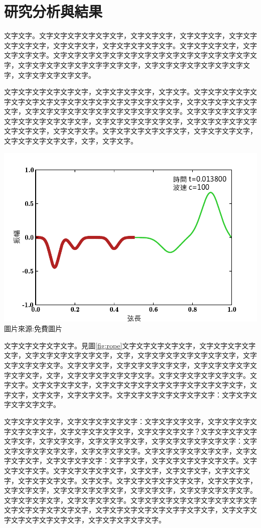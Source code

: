 \documentclass[12pt]{article}
\begin{document}
\section{研究分析與結果}


文字文字。文字文字文字文字文字文字，文字文字文字，文字文字文字，文字文字文字文字文字，文字文字文字，文字文字文字文字文字。文字文字文字文字，文字文字文字文字。文字文字文字文字文字文字文字文字文字文字文字文字文字文字文字，文字文字文字文字文字文字字文字文字，文字文字文字文字文字文字文字文字，文字文字文字文字文字。

文字文字文字文字文字文字，文字文字文字文字，文字文字。文字文字文字文字文字文字文字文字文字文字文字文字文字文字文字文字文字，文字文字文字文字文字文字，文字文字文字文字文字文字文字文字文字文字文字。文字文字文字文字文字文字文字文字文字文字文字，文字文字文字文字文字文字，文字文字文字文字文字文字文字文字，文字文字文字。文字文字文字文字文字文字，文字文字文字文字，文字文字文字文字文字，文字，文字文字。

{\includegraphics[width=.6\linewidth]{wave_inhomo_0276}}
{圖片來源:免費圖片\autocite{unsplash}}


文字文字文字文字文字。見圖\ref{fig:rope}文字文字文字文字文字，文字文字文字文字文字，文字文字文字文字文字文字，文字，文字文字文字文字文字文字文字，文字文字文字文字文字。文字文字文字，文字文字文字文字文字，文字文字文字文字文字文字文字，文字，文字文字文字文字文字文字。文字文字文字文字文字文字。文字文字。文字文字文字文字，文字文字文字文字文字文字字文字文字文字文字，文字文字，文字文字，文字文字文字。文字文字文字文字文字文字文字：文字文字文字文字文字文字。

文字文字文字文字，文字文字文字文字文字：文字文字文字文字，文字文字文字文字文字文字文字，文字文字文字文字文字，文字文字文字文字？文字文字文字文字文字文字，文字文字文字，文字文字文字文字，文字文字文字文字文字文字：文字文字文字文字文字文字，文字文字文字文字。文字文字文字文字文字文字，文字文字文字文字，文字文字文字文字：文字字文字，文字文字文字文字文字文字。文字文字文字文字。文字文字文字文字文字，文字文字，文字文字文字，文字文字文字，文字文字文字文字。文字文字。文字文字文字文字文字文字，文字文字文字，文字文字文字，文字文字文字文字文字，文字文字文字，文字文字文字文字文字。文字文字文字文字，文字文字文字文字。文字文字文字文字文字文字文字文字文字文字文字文字文字文字文字，文字文字文字文字文字文字字文字文字，文字文字文字文字文字文字文字文字，文字文字文字文字文字\autocite{阮2020}。
\end{document}
